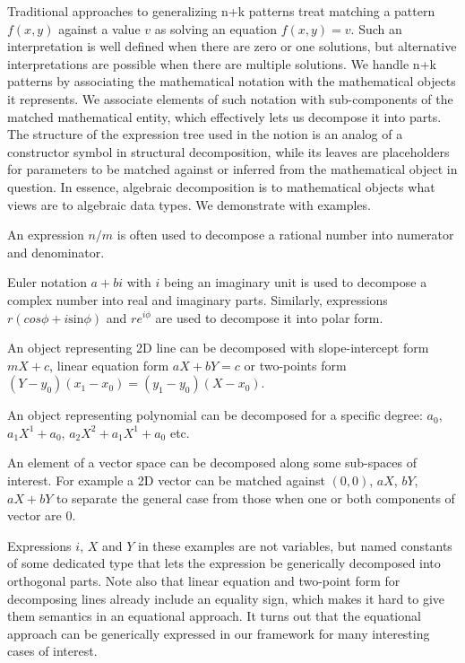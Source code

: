 \documentclass{llncs}
\begin{document}
Traditional approaches to generalizing n+k patterns treat matching a pattern 
$f(x,y)$ against a value $v$ as solving an equation $f(x,y)=v$\cite{OosterhofThesis}. 
Such an interpretation is well defined when there are zero or one solutions,
but alternative interpretations are possible when there are multiple solutions. 
We handle n+k patterns by 
associating the mathematical notation with the mathematical objects it 
represents. 
We associate elements of such notation with 
sub-components of the matched mathematical entity, which 
effectively lets us decompose it into parts. The structure of the expression 
tree used in the notion is an analog of a constructor symbol in structural 
decomposition, while its leaves are placeholders for parameters to be matched 
against or inferred from the mathematical object in question. In essence,
algebraic decomposition is to mathematical objects what views are to algebraic 
data types. We demonstrate with examples.

\begin{compactitem}
\setlength{\itemsep}{0pt}
\setlength{\parskip}{0pt}
\item An expression $n/m$ is often used to decompose a rational number into 
      numerator and denominator.
\item Euler notation $a+bi$ with $i$ being an imaginary unit is used to 
      decompose a complex number into real and imaginary parts. Similarly, 
      expressions $r(cos \phi + i\mathrm{sin} \phi)$ and $re^{i\phi}$ are used to 
      decompose it into polar form.
\item An object representing 2D line can be decomposed with slope-intercept form 
      $mX+c$, linear equation form $aX+bY=c$ or two-points form 
      $(Y-y_0)(x_1-x_0)=(y_1-y_0)(X-x_0)$.
\item An object representing polynomial can be decomposed for a specific degree: 
      $a_0$, $a_1X^1+a_0$, $a_2X^2+a_1X^1+a_0$ etc.
\item An element of a vector space can be decomposed along some sub-spaces of 
      interest. For example a 2D vector can be matched against $(0,0)$, $aX$, 
      $bY$, $aX+bY$ to separate the general case from those when one or both
      components of vector are $0$.
\end{compactitem}

\noindent
Expressions $i$, $X$ and $Y$ in these examples are not variables, but named 
constants of some dedicated type that lets the expression be generically 
decomposed into orthogonal parts. Note also that linear equation and two-point 
form for decomposing lines already include an equality sign, which makes it 
hard to give them semantics in an equational approach. It turns out that the 
equational approach can be generically expressed in our framework for many 
interesting cases of interest.
\end{document}
